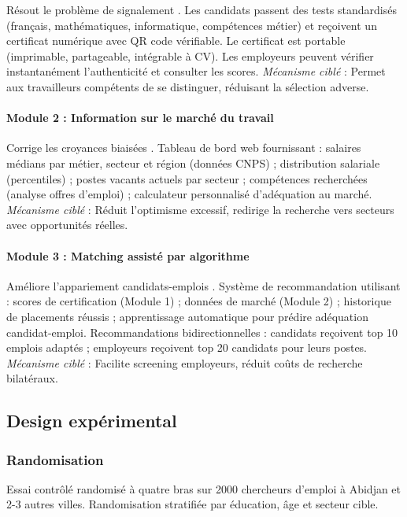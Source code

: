 \documentclass[12pt,a4paper]{article}
\begin{document}
Résout le problème de signalement \citep{carranza2022, bassi2022}. Les candidats passent des tests standardisés (français, mathématiques, informatique, compétences métier) et reçoivent un certificat numérique avec QR code vérifiable. Le certificat est portable (imprimable, partageable, intégrable à CV). Les employeurs peuvent vérifier instantanément l'authenticité et consulter les scores. \textit{Mécanisme ciblé} : Permet aux travailleurs compétents de se distinguer, réduisant la sélection adverse.

\paragraph{Module 2 : Information sur le marché du travail}

Corrige les croyances biaisées \citep{alfonsi2022, kiss2023}. Tableau de bord web fournissant : salaires médians par métier, secteur et région (données CNPS) ; distribution salariale (percentiles) ; postes vacants actuels par secteur ; compétences recherchées (analyse offres d'emploi) ; calculateur personnalisé d'adéquation au marché. \textit{Mécanisme ciblé} : Réduit l'optimisme excessif, redirige la recherche vers secteurs avec opportunités réelles.

\paragraph{Module 3 : Matching assisté par algorithme}

Améliore l'appariement candidats-emplois \citep{fernando2023}. Système de recommandation utilisant : scores de certification (Module 1) ; données de marché (Module 2) ; historique de placements réussis ; apprentissage automatique pour prédire adéquation candidat-emploi. Recommandations bidirectionnelles : candidats reçoivent top 10 emplois adaptés ; employeurs reçoivent top 20 candidats pour leurs postes. \textit{Mécanisme ciblé} : Facilite screening employeurs, réduit coûts de recherche bilatéraux.

\subsection{Design expérimental}

\subsubsection{Randomisation}

Essai contrôlé randomisé à quatre bras sur 2000 chercheurs d'emploi à Abidjan et 2-3 autres villes. Randomisation stratifiée par éducation, âge et secteur cible.
\end{document}

